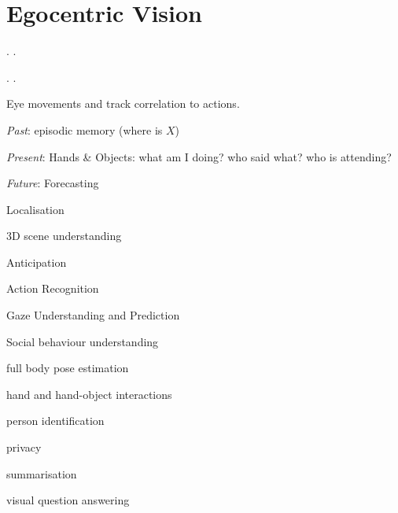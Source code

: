 \section{Egocentric Vision}
\begin{definition}[FPV]
    .
    .
\end{definition}

\begin{definition}[TPV]
    .
    .
\end{definition}

\begin{definition}
    Eye movements and track correlation to actions.
\end{definition}

\begin{definition}
    \begin{itemize*}
        \item \textit{Past}: episodic memory (where is \(X\))
        \item \textit{Present}: Hands \& Objects: what am I doing? who said what? who is attending?
        \item \textit{Future}: Forecasting
    \end{itemize*}
\end{definition}

\begin{definition}
    \begin{itemize*}
        \item Localisation
        \item 3D scene understanding
        \item Anticipation
        \item Action Recognition
        \item Gaze Understanding and Prediction
        \item Social behaviour understanding
        \item full body pose estimation
        \item hand and hand-object interactions
        \item person identification
        \item privacy
        \item summarisation
        \item visual question answering
    \end{itemize*}
\end{definition}

